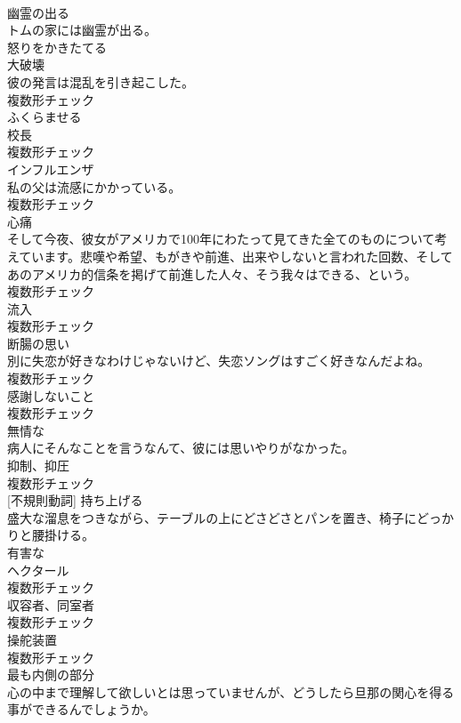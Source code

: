 \documentclass[8pt]{extreport}
\begin{document}
\begin{CJK}{UTF8}{min}
\\	[形容詞]	幽霊の出る	
\\	トムの家には幽霊が出る。	
\\	[形容詞]	怒りをかきたてる	
\\	[名詞]	大破壊	
\\	彼の発言は混乱を引き起こした。	
\\	複数形チェック
\\	[動詞]	ふくらませる	
\\	[名詞]	校⻑	
\\	複数形チェック
\\	[名詞]	インフルエンザ	
\\	私の父は流感にかかっている。	
\\	複数形チェック
\\	[名詞]	心痛	
\\	そして今夜、彼女がアメリカで100年にわたって見てきた全てのものについて考えています。悲嘆や希望、もがきや前進、出来やしないと言われた回数、そしてあのアメリカ的信条を掲げて前進した人々、そう我々はできる、という。	
\\	複数形チェック
\\	[名詞]	流入	
\\	複数形チェック
\\	[名詞]	断腸の思い	
\\	別に失恋が好きなわけじゃないけど、失恋ソングはすごく好きなんだよね。	
\\	複数形チェック
\\	[名詞]	感謝しないこと	
\\	複数形チェック
\\	[形容詞]	無情な	
\\	病人にそんなことを言うなんて、彼には思いやりがなかった。	
\\	[名詞]	抑制、抑圧	
\\	複数形チェック
\\	[動詞] [不規則動詞]	持ち上げる	
\\	盛大な溜息をつきながら、テーブルの上にどさどさとパンを置き、椅子にどっかりと腰掛ける。	
\\	[形容詞]	有害な	
\\	[名詞]	ヘクタール	
\\	複数形チェック
\\	[名詞]	収容者、同室者	
\\	複数形チェック
\\	[名詞]	操舵装置	
\\	複数形チェック
\\	[名詞]	最も内側の部分	
\\	心の中まで理解して欲しいとは思っていませんが、どうしたら旦那の関心を得る事ができるんでしょうか。	

\end{CJK}
\end{document}
